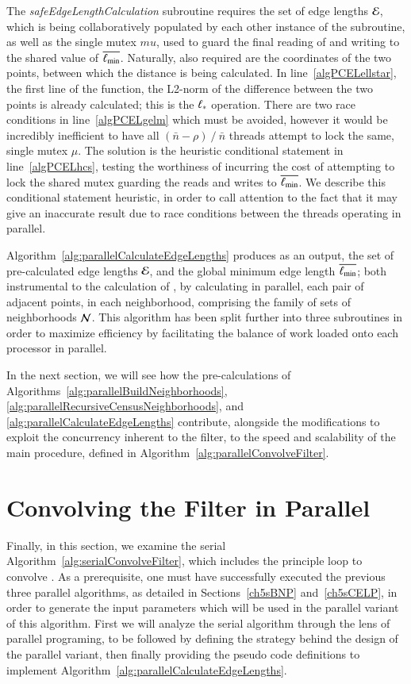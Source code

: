 The \textit{safeEdgeLengthCalculation} subroutine requires the set of edge lengths $\mathcal{E}$, which is being collaboratively populated by each other instance of the subroutine, as well as the single mutex $mu$, used to guard the final reading of and writing to the shared value of $\overline{\ell_\text{min}}$. Naturally, also required are the coordinates of the two points, between which the distance is being calculated. In line~\ref{algPCELellstar}, the first line of the function, the L2-norm of the difference between the two points is already calculated; this is the $\ell_\ast$ operation. There are two race conditions in line~\ref{algPCELgelm} which must be avoided, however it would be incredibly inefficient to have all $(\bar{n}-\rho)\mathbin{/}\bar{n}$ threads attempt to lock the same, single mutex $\mu$. The solution is the heuristic conditional statement in line~\ref{algPCELhcs}, testing the worthiness of incurring the cost of attempting to lock the shared mutex guarding the reads and writes to $\overline{\ell_\text{min}}$. We describe this conditional statement heuristic, in order to call attention to the fact that it may give an inaccurate result due to race conditions between the threads operating in parallel. 

Algorithm~\ref{alg:parallelCalculateEdgeLengths} produces as an output, the set of pre-calculated edge lengths $\mathcal{E}$, and the global minimum edge length $\overline{\ell_\text{min}}$; both instrumental to the calculation of , by calculating in parallel, each pair of adjacent points, in each neighborhood, comprising the family of sets of neighborhoods $\mathcal{N}$. This algorithm has been split further into three subroutines in order to maximize efficiency by facilitating the balance of work loaded onto each processor in parallel.

In the next section, we will see how the pre-calculations of Algorithms~\ref{alg:parallelBuildNeighborhoods}, \ref{alg:parallelRecursiveCensusNeighborhoods}, and \ref{alg:parallelCalculateEdgeLengths} contribute, alongside the modifications to exploit the concurrency inherent to the filter, to the speed and scalability of the main procedure, defined in Algorithm~\ref{alg:parallelConvolveFilter}.

%
%
%
%
\section{Convolving the Filter in Parallel}
\label{ch5sCFP}
Finally, in this section, we examine the serial Algorithm~\ref{alg:serialConvolveFilter}, which includes the principle loop to convolve . As a prerequisite, one must have successfully executed the previous three parallel algorithms, as detailed in Sections~\ref{ch5sBNP} and~\ref{ch5sCELP}, in order to generate the input parameters which will be used in the parallel variant of this algorithm. First we will analyze the serial algorithm through the lens of parallel programing, to be followed by defining the strategy behind the design of the parallel variant, then finally providing the pseudo code definitions to implement Algorithm~\ref{alg:parallelCalculateEdgeLengths}.

